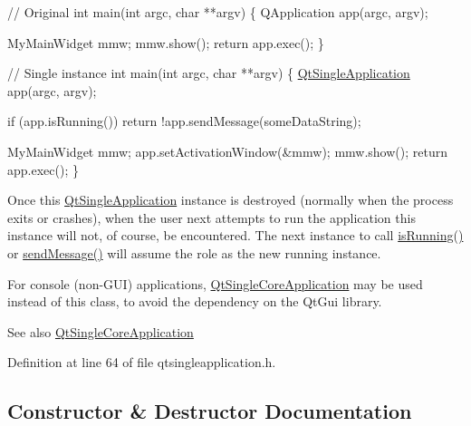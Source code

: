 \begin{DoxyCode}
\textcolor{comment}{// Original}
\textcolor{keywordtype}{int} main(\textcolor{keywordtype}{int} argc, \textcolor{keywordtype}{char} **argv)
\{
    QApplication app(argc, argv);

    MyMainWidget mmw;
    mmw.show();
    \textcolor{keywordflow}{return} app.exec();
\}

\textcolor{comment}{// Single instance}
\textcolor{keywordtype}{int} main(\textcolor{keywordtype}{int} argc, \textcolor{keywordtype}{char} **argv)
\{
    \hyperlink{class_qt_single_application}{QtSingleApplication} app(argc, argv);

    \textcolor{keywordflow}{if} (app.isRunning())
        \textcolor{keywordflow}{return} !app.sendMessage(someDataString);

    MyMainWidget mmw;
    app.setActivationWindow(&mmw);
    mmw.show();
    \textcolor{keywordflow}{return} app.exec();
\}
\end{DoxyCode}


Once this \hyperlink{class_qt_single_application}{Qt\+Single\+Application} instance is destroyed (normally when the process exits or crashes), when the user next attempts to run the application this instance will not, of course, be encountered. The next instance to call \hyperlink{class_qt_single_application_aa9f0e6e4f18ac79bbb7a955cd860894d}{is\+Running()} or \hyperlink{class_qt_single_application_a0e2f3900f0290913c738ec6b4b959922}{send\+Message()} will assume the role as the new running instance.

For console (non-\/\+G\+UI) applications, \hyperlink{class_qt_single_core_application}{Qt\+Single\+Core\+Application} may be used instead of this class, to avoid the dependency on the Qt\+Gui library.

\begin{DoxySeeAlso}{See also}
\hyperlink{class_qt_single_core_application}{Qt\+Single\+Core\+Application} 
\end{DoxySeeAlso}


Definition at line 64 of file qtsingleapplication.\+h.



\subsection{Constructor \& Destructor Documentation}
\mbox{\label{class_qt_single_application_afe5e96d236e42949e65669eca282acbd}} 
